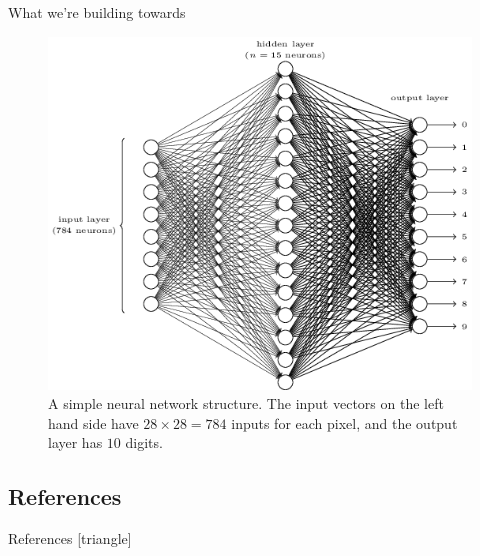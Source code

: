 \documentclass[xcolor=dvipsnames, fontsize=11pt, %
pagesize, %
parskip=half-, t]{beamer}
\begin{document}
\begin{frame}{What we're building towards}
\begin{figure}
\center
\includegraphics[scale=0.36]{goal.png}
\caption{A simple neural network structure. The input vectors on the left hand side have $28\times 28=784$ inputs for each pixel, and the output layer has $10$ digits.}
\end{figure}
\end{frame}



\subsection{References}
\begin{frame}[c]{References}
[triangle]

\href{http://neuralnetworksanddeeplearning.com/chap1.html}{} \smallskip

\href{https://towardsdatascience.com/a-beginners-guide-to-neural-networks-part-two-bd503514c71a}{} \smallskip

\href{http://tutorial.math.lamar.edu/Classes/CalcIII/CalcIII.aspx}{} 
\end{frame}
\end{document}
